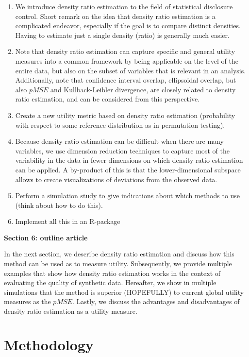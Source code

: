 \documentclass[
]{article}
\begin{document}
\begin{enumerate}
\def\labelenumi{\arabic{enumi}.}
\item
  We introduce density ratio estimation to the field of statistical
  disclosure control. Short remark on the idea that density ratio
  estimation is a complicated endeavor, especially if the goal is to
  compare distinct densities. Having to estimate just a single density
  (ratio) is generally much easier.
\item
  Note that density ratio estimation can capture specific and general
  utility measures into a common framework by being applicable on the
  level of the entire data, but also on the subset of variables that is
  relevant in an analysis. Additionally, note that confidence interval
  overlap, ellipsoidal overlap, but also \(pMSE\) and Kullback-Leibler
  divergence, are closely related to density ratio estimation, and can
  be considered from this perspective.
\item
  Create a new utility metric based on density ratio estimation
  (probability with respect to some reference distribution as in
  permutation testing).
\item
  Because density ratio estimation can be difficult when there are many
  variables, we use dimension reduction techniques to capture most of
  the variability in the data in fewer dimensions on which density ratio
  estimation can be applied. A by-product of this is that the
  lower-dimensional subspace allows to create visualizations of
  deviations from the observed data.
\item
  Perform a simulation study to give indications about which methods to
  use (think about how to do this).
\item
  Implement all this in an R-package
\end{enumerate}

\textbf{Section 6: outline article}

In the next section, we describe density ratio estimation and discuss
how this method can be used as to measure utility. Subsequently, we
provide multiple examples that show how density ratio estimation works
in the context of evaluating the quality of synthetic data. Hereafter,
we show in multiple simulations that the method is superior (HOPEFULLY)
to current global utility measures as the \(pMSE\). Lastly, we discuss
the advantages and disadvantages of density ratio estimation as a
utility measure.

\hypertarget{methodology}{%
\section{Methodology}\label{methodology}}
\end{document}

